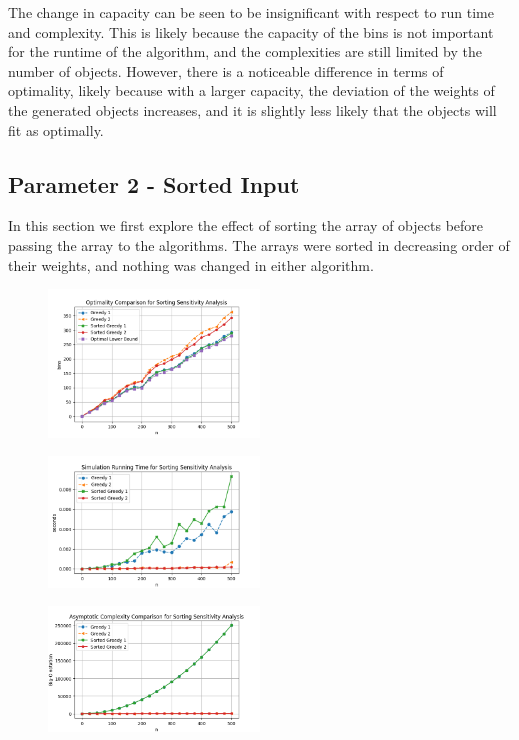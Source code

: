 \documentclass[11pt]{article}
\begin{document}
\begin{multicols}{2}
\begin{figure}[H]
	\end{figure}
	The change in capacity can be seen to be insignificant with respect to run time and complexity.
	This is likely because the capacity of the bins is not important for the runtime of the
	algorithm, and the complexities are still limited by the number of objects. However, there is a
	noticeable difference in terms of optimality, likely because with a larger capacity, the
	deviation of the weights of the generated objects increases, and it is slightly less likely that
	the objects will fit as optimally.

	\subsection{Parameter 2 - Sorted Input}
	In this section we first explore the effect of sorting the array of objects before passing the
	array to the algorithms. The arrays were sorted in decreasing order of their weights, and
	nothing was changed in either algorithm.
	\begin{figure}[H]
		\centering
		\includegraphics[width=0.5\textwidth]{images/s2_optimality.png}
	\end{figure}
	\begin{figure}[H]
		\centering
		\includegraphics[width=0.5\textwidth]{images/s2_simtime.png}
	\end{figure}
	\begin{figure}[H]
		\centering
		\includegraphics[width=0.5\textwidth]{images/s2_complexity.png}

\end{figure}
\end{multicols}
\end{document}
